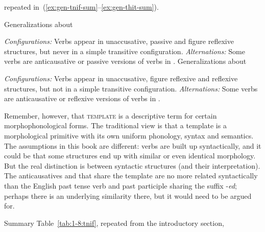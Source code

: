 \begin{exe}
\begin{xlist}
\begin{xlist}
\begin{exe}
\begin{xlist}
\begin{xlist}
\begin{exe}
\begin{xlist}
\begin{xlist}
\begin{exe}
\begin{exe}
\begin{xlist}
\begin{exe}
\begin{exe}
\begin{xlist}
\begin{exe}
\begin{exe}
\begin{exe}
\begin{exe}
\begin{exe}
\begin{xlist}
\begin{exe}
\begin{xlist}
\begin{exe}
\begin{exe}
\begin{xlist}
\begin{exe}
\begin{xlist}
\begin{exe}
\begin{xlist}
\begin{exe}
\begin{exe}
\begin{exe}
\begin{xlist}
\begin{exe}
\begin{exe}
\begin{exe}
\begin{xlist}
\begin{exe}
\begin{xlist}
\begin{exe}
\begin{exe}
\begin{xlist}
\begin{exe}
\begin{exe}
\begin{exe}
\begin{exe}
\begin{xlist}
\begin{exe}
\begin{xlist}
\begin{exe}
\begin{xlist}
\begin{exe}
\begin{xlist}
\begin{exe}
\begin{xlist}
\begin{exe}
\begin{xlist}
\begin{exe}
\begin{exe}
\begin{xlist}
\begin{exe}
\begin{xlist}
\begin{exe}
\begin{exe}
\begin{xlist}
\begin{exe}
\begin{xlist}
\begin{exe}
\begin{exe}
\begin{exe}
\begin{exe}
\begin{xlist}
\begin{xlist}
\begin{exe}
\begin{xlist}
\begin{exe}
\begin{exe}
\begin{exe}
\begin{xlist}
\begin{exe}
\begin{exe}
\begin{xlist}
\begin{exe}
\begin{exe}
\begin{exe}
\begin{xlist}
\begin{xlist}
\begin{exe}
\begin{xlist}
\begin{exe}
\begin{exe}
\begin{exe}
\begin{exe}
\begin{xlist}
\begin{exe}
\begin{xlist}
\begin{exe}
\begin{xlist}
\begin{exe}
\begin{xlist}
\begin{exe}
\begin{exe}
\begin{exe}
\begin{exe}
\begin{exe}
\begin{xlist}
\begin{exe}
\begin{xlist}
repeated in~(\ref{ex:gen-tnif-sum}--\ref{ex:gen-thit-sum}).

 \begin{exe}
 \ex  \label{ex:gen-tnif-sum}Generalizations about {\tnif}
 \begin{xlist} 
 	\ex  \textit{Configurations:} Verbs appear in unaccusative, passive and figure reflexive structures, but never in a simple transitive configuration. 
 	\ex  \textit{Alternations:} Some verbs are anticausative or passive versions of verbs in {\tkal}. 
 \z
 \ex  \label{ex:gen-thit-sum}Generalizations about {\thit}
 \begin{xlist} 
 	\ex  \textit{Configurations:} Verbs appear in unaccusative, figure reflexive and reflexive structures, but not in a simple transitive configuration. 
 	\ex \sloppy \textit{Alternations:} Some verbs are anticausative or reflexive versions of verbs in {\tpie}. 
 \z
\z 

Remember, however, that \textsc{template} is a descriptive term for certain morphophonological forms. The traditional view is that a template is a morphological primitive with its own uniform phonology, syntax and semantics. The assumptions in this book are different: verbs are built up syntactically, and it could be that some structures end up with similar or even identical morphology. But the real distinction is between syntactic structures (and their interpretation). The anticausatives and  that share the template {\tnif} are no more related syntactically than the English past tense verb and past participle sharing the suffix -\emph{ed}; perhaps there is an underlying similarity there, but it would need to be argued for.

Summary Table~\ref{tab:1-8:tnif}, repeated from the introductory section, 
\end{xlist}
\end{xlist}
\end{exe}
\end{xlist}
\end{exe}
\end{xlist}
\end{exe}
\end{exe}
\end{exe}
\end{exe}
\end{exe}
\end{xlist}
\end{exe}
\end{xlist}
\end{exe}
\end{xlist}
\end{exe}
\end{xlist}
\end{exe}
\end{exe}
\end{exe}
\end{exe}
\end{xlist}
\end{exe}
\end{xlist}
\end{xlist}
\end{exe}
\end{exe}
\end{exe}
\end{xlist}
\end{exe}
\end{exe}
\end{xlist}
\end{exe}
\end{exe}
\end{exe}
\end{xlist}
\end{exe}
\end{xlist}
\end{xlist}
\end{exe}
\end{exe}
\end{exe}
\end{exe}
\end{xlist}
\end{exe}
\end{xlist}
\end{exe}
\end{exe}
\end{xlist}
\end{exe}
\end{xlist}
\end{exe}
\end{exe}
\end{xlist}
\end{exe}
\end{xlist}
\end{exe}
\end{xlist}
\end{exe}
\end{xlist}
\end{exe}
\end{xlist}
\end{exe}
\end{xlist}
\end{exe}
\end{exe}
\end{exe}
\end{exe}
\end{xlist}
\end{exe}
\end{exe}
\end{xlist}
\end{exe}
\end{xlist}
\end{exe}
\end{exe}
\end{exe}
\end{xlist}
\end{exe}
\end{exe}
\end{exe}
\end{xlist}
\end{exe}
\end{xlist}
\end{exe}
\end{xlist}
\end{exe}
\end{exe}
\end{xlist}
\end{exe}
\end{xlist}
\end{exe}
\end{exe}
\end{exe}
\end{exe}
\end{exe}
\end{xlist}
\end{exe}
\end{exe}
\end{xlist}
\end{exe}
\end{exe}
\end{xlist}
\end{xlist}
\end{exe}
\end{xlist}
\end{xlist}
\end{exe}
\end{xlist}
\end{xlist}
\end{exe}
